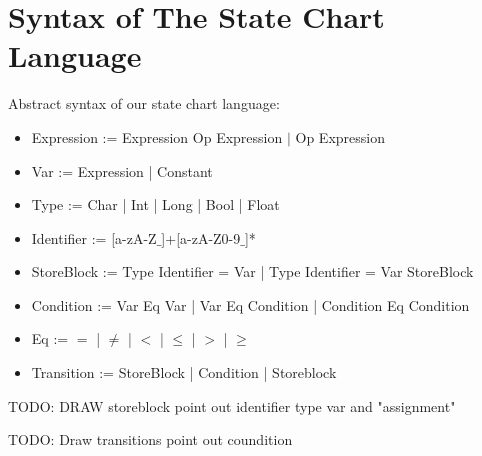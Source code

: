 \section{Syntax of The State Chart Language}

Abstract syntax of our state chart language:

\begin{itemize}
	\item Expression := Expression Op Expression $|$ Op Expression
	\item Var := Expression | Constant
	\item Type := Char | Int | Long | Bool | Float
	\item Identifier := [a-zA-Z$\_$]+[a-zA-Z0-9$\_$]*  
	
	\item StoreBlock := Type Identifier = Var | Type Identifier = Var StoreBlock

	\item Condition := Var Eq Var | Var Eq Condition | Condition Eq Condition
	
	\item Eq := $=$ | $\neq$ | $<$ | $\leq$ | $>$ | $\geq$	
	
	\item Transition := StoreBlock | Condition | Storeblock
	
\end{itemize}

TODO: DRAW storeblock point out identifier type var and "assignment"

TODO: Draw transitions point out coundition

